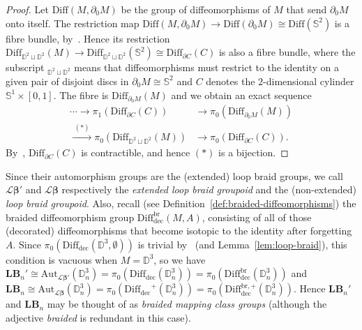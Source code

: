 \documentclass[AHL,Unicode,published]{cedram}
\newcommand{\Diff}{\mathrm{Diff}}
\newcommand{\Aut}{\mathrm{Aut}}
\newcommand{\rdec}{\mathrm{dec}}
\newcommand{\lB}{\mathbf{LB}}
\newcommand{\cL}{\mathcal{L}}
\newcommand{\bD}{\mathbb{D}}
\newcommand{\bS}{\mathbb{S}}
\newcommand{\too}{\ensuremath{\longrightarrow}}
\newcommand{\diffdec}{\ensuremath{\mathrm{Diff}_{\rdec}}}
\newcommand{\diffdecbr}{\ensuremath{\mathrm{Diff}_{\rdec}^{\mathrm{br}}}}
\newcommand{\diffdecbrplus}{\ensuremath{\mathrm{Diff}_{\rdec}^{\mathrm{br},+}}}
\newcommand{\Beta}{\boldsymbol{\beta}}
\begin{document}
\begin{proof}
Let $\Diff(M,\partial_{0} M)$ be the group of diffeomorphisms of $M$ that send $\partial_{0} M$ onto itself. The restriction map $\Diff(M,\partial_{0} M) \rightarrow \Diff(\partial_{0} M) \cong \Diff(\bS^2)$ is a fibre bundle, by~\cite[p.~294, \S~II.2.2.2, Cor.~2]{Cerf1961Topologiedecertains}. Hence its restriction $\Diff_{\bD^2 \sqcup \bD^2}(M) \too \Diff_{\bD^2 \sqcup \bD^2}(\bS^2) \cong \Diff_{\partial C}(C)$ is also a fibre bundle, where the subscript ${}_{\bD^2 \sqcup \bD^2}$ means that diffeomorphisms must restrict to the identity on a given pair of disjoint discs in $\partial_{0} M \cong \bS^2$ and $C$ denotes the $2$-dimensional cylinder $\bS^1 \times [0,1]$. The fibre is $\Diff_{\partial_{0} M}(M)$ and we obtain an exact sequence
\begin{align*}
\cdots \to \pi_{1}(\Diff_{\partial C}(C)) &\too \pi_{0}(\Diff_{\partial_{0} M}(M)) \\
\xrightarrow{\;(*)\;} \pi_{0}\left(\Diff_{\bD^2\sqcup\bD^2}(M)\right) &\too \pi_{0}(\Diff_{\partial C}(C)).
\end{align*}
By~\cite[Théorème~1]{gramain1973type}, $\Diff_{\partial C}(C)$ is contractible, and hence $(*)$ is a bijection.
\end{proof}

Since their automorphism groups are the (extended) loop braid groups, we call $\cL\Beta'$ and $\cL\Beta$ respectively the \emph{extended loop braid groupoid} and the (non-extended) \emph{loop braid groupoid}. Also, recall (see Definition~\ref{def:braided-diffeomorphisms}) the braided diffeomorphism group $\diffdecbr(M,A)$, consisting of all of those (decorated) diffeomorphisms that become isotopic to the identity after forgetting $A$. Since $\pi_{0}(\diffdec(\bD^{3},\emptyset))$ is trivial by~\cite{Cerf1968} (and Lemma~\ref{lem:loop-braid}), this condition is vacuous when $M = \bD^3$, so we have $\lB_{n}' \cong \Aut_{\cL\Beta'}(\bD^{3}_{n}) = \pi_{0}(\diffdec(\bD^3_n)) = \pi_{0}(\diffdecbr(\bD^3_n))$ and $\lB_{n} \cong \Aut_{\cL\Beta}(\bD^{3}_{n}) = \pi_{0}(\diffdec^{+}(\bD^3_n)) = \pi_{0}(\diffdecbrplus(\bD^3_n))$. Hence $\lB_{n}'$ and $\lB_{n}$ may be thought of as \emph{braided mapping class groups} (although the adjective \emph{braided} is redundant in this case).
\end{document}
